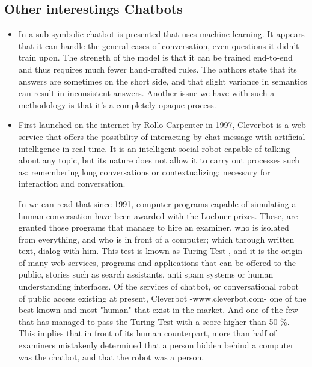 \documentclass[12pt,twoside]{article}
\theoremstyle{plain}
\theoremstyle{definition}
\theoremstyle{remark}
\begin{document}
						
\subsection{Other interestings Chatbots}
	\label{sec:other}
	
	\begin{itemize}
	
	\item In \cite{vinyals2015neural} a sub symbolic chatbot is presented that uses machine learning. It appears that it can handle the general cases of conversation, even questions it didn’t train upon. The strength of the model is that it can be trained end-to-end and thus requires much fewer hand-crafted rules. The authors state that its answers are sometimes on the short side, and that slight variance in semantics can result in inconsistent answers. Another issue we have with such a methodology is that it’s a completely opaque process.
	
	\item  First launched on the internet by Rollo Carpenter in
1997, Cleverbot is a web service that offers the possibility of interacting by chat message with artificial intelligence in real time. It is an intelligent social robot capable of talking about any topic, but its nature does not allow it to carry out processes such as: remembering long conversations or contextualizing; necessary for interaction and conversation.\cite{molinero2013absurdo}
	
	In \cite{molinero2013absurdo} we can read that since 1991, computer programs capable of simulating a human conversation have been awarded with the Loebner prizes. These, are granted those programs that manage to hire an examiner, who is isolated from everything, and who is in front of a computer; which through written text, dialog with him. This test is known as Turing Test \cite{naor1996verification}, and it is the origin of many web services, programs and applications that can be offered to the public, stories such as search assistants, anti spam systems or human understanding interfaces. Of the services of chatbot, or conversational robot of public access existing at present, Cleverbot -www.cleverbot.com- one of the best known and most "human" that exist in the market. And one of the few that has managed to pass the Turing Test with a score higher than 50 \%. This implies that in front of its human counterpart, more than half of examiners mistakenly determined that a person hidden behind a computer was the chatbot, and that the robot was a person.	
	\end{itemize}
 
\end{document}
